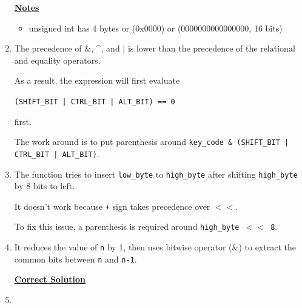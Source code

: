 \documentclass[12pt]{article}
\begin{document}
\begin{enumerate}[1.]
    \bigskip

    \underline{\textbf{Notes}}

    \begin{itemize}
        \item unsigned int has 4 bytes or (0x0000) or (0000000000000000, 16 bits)
    \end{itemize}

    \item

    The precedence of \&, \^{}, and | is lower than the precedence of the relational
    and equality operators.

    \bigskip

    As a result, the expression will first evaluate

    \bigskip

    \texttt{(SHIFT\_BIT | CTRL\_BIT | ALT\_BIT) == 0}

    \bigskip

    first.

    \bigskip

    The work around is to put parenthesis around \texttt{key\_code \& (SHIFT\_BIT | CTRL\_BIT | ALT\_BIT)}.

    \item

    The function tries to insert \texttt{low\_byte} to \texttt{high\_byte} after
    shifting \texttt{high\_byte} by 8 bits to left.

    \bigskip

    It doesn't work because \texttt{+} sign takes precedence over \texttt{$<<$}.

    \bigskip

    To fix this issue, a parenthesis is required around \texttt{high\_byte $<<$ 8}.

    \bigskip

    \item

    It reduces the value of \texttt{n} by 1, then uses bitwise operator (\&) to
    extract the common bits between \texttt{n} and \texttt{n-1}.

    \bigskip

    \begin{mdframed}
    \underline{\textbf{Correct Solution}}

    \bigskip

    \end{mdframed}

    \item


\end{enumerate}
\end{document}
